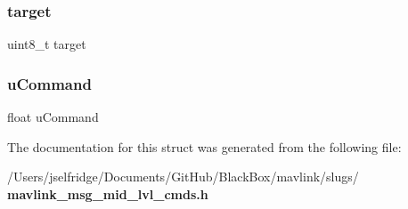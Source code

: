 \mbox{\label{struct____mavlink__mid__lvl__cmds__t_a5f333beb3be5b82c1e091308136aeb7d}} 
\subsubsection{target}
{\footnotesize\ttfamily uint8\+\_\+t target}

\mbox{\label{struct____mavlink__mid__lvl__cmds__t_ab51628125c5f7ca97f6057927694be8c}} 
\subsubsection{u\+Command}
{\footnotesize\ttfamily float u\+Command}



The documentation for this struct was generated from the following file\+:\begin{DoxyCompactItemize}
\item 
/\+Users/jselfridge/\+Documents/\+Git\+Hub/\+Black\+Box/mavlink/slugs/\textbf{ mavlink\+\_\+msg\+\_\+mid\+\_\+lvl\+\_\+cmds.\+h}\end{DoxyCompactItemize}
